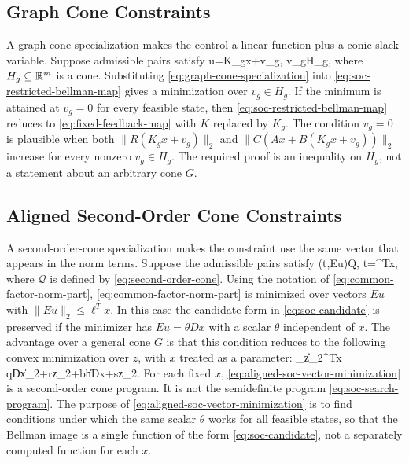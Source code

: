 \documentclass{article}
\begin{document}
\subsection{Graph Cone Constraints}

A graph-cone specialization makes the control a linear function plus a conic slack variable. Suppose admissible pairs satisfy
\BEQ
u=K_gx+v_g,
\quad v_g\in H_g,
\label{eq:graph-cone-specialization}
\EEQ
where $H_g\subseteq\mathbb{R}^m$ is a cone. Substituting \eqref{eq:graph-cone-specialization} into \eqref{eq:soc-restricted-bellman-map} gives a minimization over $v_g\in H_g$. If the minimum is attained at $v_g=0$ for every feasible state, then \eqref{eq:soc-restricted-bellman-map} reduces to \eqref{eq:fixed-feedback-map} with $K$ replaced by $K_g$. The condition $v_g=0$ is plausible when both $\|R(K_gx+v_g)\|_2$ and $\|C(Ax+B(K_gx+v_g))\|_2$ increase for every nonzero $v_g\in H_g$. The required proof is an inequality on $H_g$, not a statement about an arbitrary cone $G$.

\subsection{Aligned Second-Order Cone Constraints}

A second-order-cone specialization makes the constraint use the same vector that appears in the norm terms. Suppose the admissible pairs satisfy
\BEQ
(t,Eu)\in \mathcal Q,
\quad t=\ell^Tx,
\label{eq:aligned-soc-specialization}
\EEQ
where $\mathcal Q$ is defined by \eqref{eq:second-order-cone}. Using the notation of \eqref{eq:common-factor-norm-part}, \eqref{eq:common-factor-norm-part} is minimized over vectors $Eu$ with $\|Eu\|_2\leq \ell^Tx$. In this case the candidate form in \eqref{eq:soc-candidate} is preserved if the minimizer has $Eu=\theta Dx$ with a scalar $\theta$ independent of $x$. The advantage over a general cone $G$ is that this condition reduces to the following convex minimization over $z$, with $x$ treated as a parameter:
\BEQ
\min_{\|z\|_2\leq \ell^Tx}
q\|Dx\|_2+r\|z\|_2+\gamma b\|hDx+sz\|_2.
\label{eq:aligned-soc-vector-minimization}
\EEQ
For each fixed $x$, \eqref{eq:aligned-soc-vector-minimization} is a second-order cone program. It is not the semidefinite program \eqref{eq:soc-search-program}. The purpose of \eqref{eq:aligned-soc-vector-minimization} is to find conditions under which the same scalar $\theta$ works for all feasible states, so that the Bellman image is a single function of the form \eqref{eq:soc-candidate}, not a separately computed function for each $x$.
\end{document}
